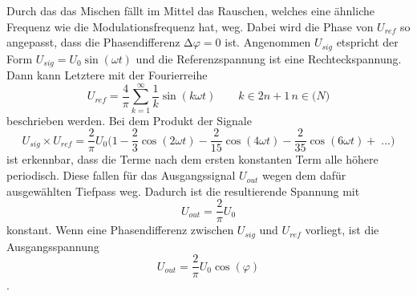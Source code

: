 \noindent Durch das das Mischen fällt im Mittel das Rauschen, welches eine ähnliche Frequenz wie die Modulationsfrequenz hat, weg.
Dabei wird die Phase von $U_{ref}$ so angepasst, dass die Phasendifferenz $\increment \varphi=0$ ist.
Angenommen $U_{sig}$ etspricht der Form $U_{sig}=U_0 \sin(\omega t)$ und die Referenzspannung ist eine Rechteckspannung.
Dann kann Letztere mit der Fourierreihe 
\begin{equation}
    U_{ref}=\frac{4}{\pi} \sum_{k=1}^\infty \frac{1}{k}\sin(k\omega t) \qquad k \in 2n+1 \, n \in \mathbb(N)
    \label{eqn:Fourier}
\end{equation}
beschrieben werden.
Bei dem Produkt der Signale 
\begin{equation}
    U_{sig} \times U_{ref}=\frac{2}{\pi}U_0 \biggl(1-\frac{2}{3}\cos(2\omega t)-\frac{2}{15}\cos(4\omega t)- \frac{2}{35}\cos(6 \omega t)+ \; ...\biggr)
    \label{eqn:Produkt}
\end{equation}
ist erkennbar, dass die Terme nach dem ersten konstanten Term alle höhere periodisch.
Diese fallen für das Ausgangssignal $U_{out}$ wegen dem dafür ausgewählten Tiefpass weg.
Dadurch ist die resultierende Spannung mit
\begin{equation}
    U_{out}=\frac{2}{\pi}U_0
    \label{eqn:konst}
\end{equation}
konstant.
Wenn eine Phasendifferenz zwischen $U_{sig}$ und $U_{ref}$ vorliegt, ist die Ausgangsspannung 
\begin{equation}
    U_{out}=\frac{2}{\pi}U_0 \cos(\varphi)
    \label{eqn:cos}
\end{equation}.
